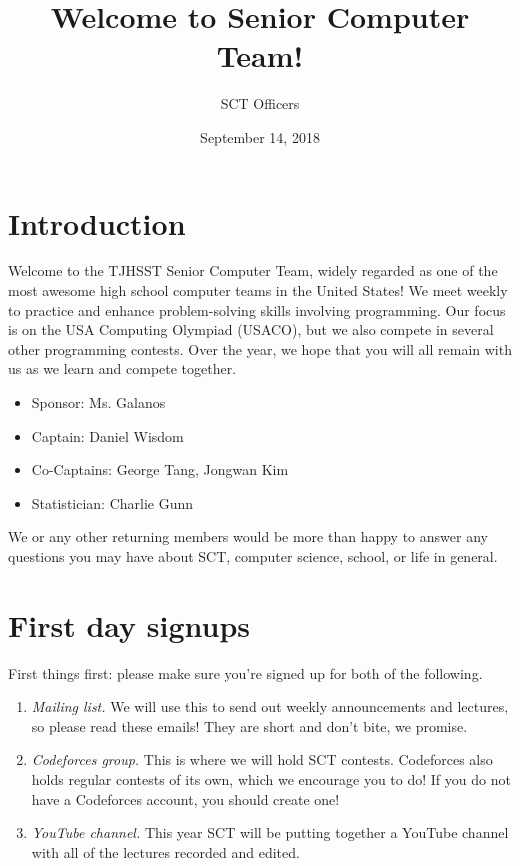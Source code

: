 \documentclass{article}
\title{Welcome to Senior Computer Team!}
\author{SCT Officers}
\date{September 14, 2018}
\begin{document}
\maketitle

\section{Introduction}

Welcome to the TJHSST Senior Computer Team, widely regarded as one of the most awesome high school computer teams in the United States! We meet weekly to practice and enhance problem-solving skills involving programming. Our focus is on the USA Computing Olympiad (USACO), but we also compete in several other programming contests. Over the year, we hope that you will all remain with us as we learn
and compete together.

\begin{itemize}
	\item Sponsor: Ms. Galanos
	\item Captain: Daniel Wisdom
	\item Co-Captains: George Tang, Jongwan Kim
	\item Statistician: Charlie Gunn
\end{itemize}

We or any other returning members would be more than happy to answer any questions you may have about SCT, computer science, school, or life in general.


\section{First day signups}

First things first: please make sure you're signed up for both of the following.

\begin{enumerate}
    \item \textit{Mailing list.} We will use this to send out weekly announcements and lectures, so please read these emails! They are short and don't bite, we promise.
    \item \textit{Codeforces group.} This is where we will hold SCT contests. Codeforces also holds regular contests of its own, which we encourage you to do! If you do not have a Codeforces account, you should create one!
    \item \textit{YouTube channel.} This year SCT will be putting together a YouTube channel with all of the lectures recorded and edited. 
\end{enumerate}
\end{document}
